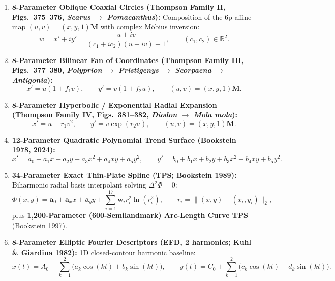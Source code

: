 \documentclass[10.5pt,a4paper]{article}
\begin{document}
\begin{enumerate}
  \[
    z \longmapsto \frac{a z + b}{c z + 1}, \qquad z = x + i y \in \mathbb{C}, \quad a, b, c \in \mathbb{C},
  \]
  mapping Cartesian lines to orthogonal pencils of coaxial circles.
  \item \textbf{8-Parameter Oblique Coaxial Circles (Thompson Family II, Figs.\ 375--376, \emph{Scarus} $\to$ \emph{Pomacanthus}):} Composition of the 6p affine map $(u, v) = (x, y, 1)\bm{M}$ with complex M\"obius inversion:
  \[
    w = x' + i y' = \frac{u + i v}{(c_1 + i c_2)(u + i v) + 1}, \qquad (c_1, c_2) \in \mathbb{R}^2.
  \]
  \item \textbf{8-Parameter Bilinear Fan of Coordinates (Thompson Family III, Figs.\ 377--380, \emph{Polyprion} $\to$ \emph{Pristigenys} $\to$ \emph{Scorpaena} $\to$ \emph{Antigonia}):}
  \[
    x' = u(1 + f_1 v), \qquad y' = v(1 + f_2 u), \qquad (u, v) = (x, y, 1)\bm{M}.
  \]
  \item \textbf{8-Parameter Hyperbolic / Exponential Radial Expansion (Thompson Family IV, Figs.\ 381--382, \emph{Diodon} $\to$ \emph{Mola mola}):}
  \[
    x' = u + r_1 v^2, \qquad y' = v \exp(r_2 u), \qquad (u, v) = (x, y, 1)\bm{M}.
  \]
  \item \textbf{12-Parameter Quadratic Polynomial Trend Surface (Bookstein 1978, 2024):}
  \[
    x' = a_0 + a_1 x + a_2 y + a_3 x^2 + a_4 x y + a_5 y^2, \qquad
    y' = b_0 + b_1 x + b_2 y + b_3 x^2 + b_4 x y + b_5 y^2.
  \]
  \item \textbf{34-Parameter Exact Thin-Plate Spline (TPS; Bookstein 1989):} Biharmonic radial basis interpolant solving $\Delta^2 \Phi = 0$:
  \[
    \Phi(x, y) = \bm{a}_0 + \bm{a}_x x + \bm{a}_y y + \sum_{i=1}^{17} \bm{w}_i r_i^2 \ln(r_i^2), \qquad r_i = \|(x,y) - (x_i,y_i)\|_2,
  \]
  plus \textbf{1,200-Parameter (600-Semilandmark) Arc-Length Curve TPS} (Bookstein 1997).
  \item \textbf{8-Parameter Elliptic Fourier Descriptors (EFD, 2 harmonics; Kuhl \& Giardina 1982):} 1D closed-contour harmonic baseline:
  \[
    x(t) = A_0 + \sum_{k=1}^{2} \bigl(a_k \cos(k t) + b_k \sin(k t)\bigr), \qquad
    y(t) = C_0 + \sum_{k=1}^{2} \bigl(c_k \cos(k t) + d_k \sin(k t)\bigr).
  \]
\end{enumerate}
\end{document}
